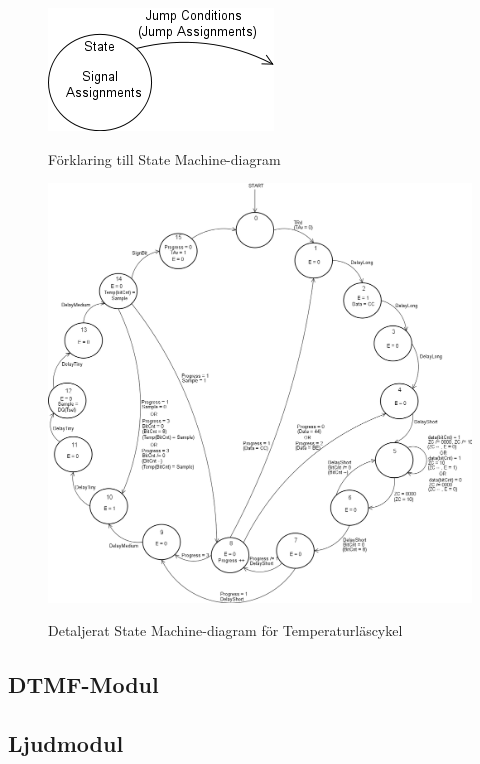 \documentclass[a4paper,11pt]{article}
\begin{document}
	\begin{figure}[ht!tb]
	  \centering
	      \includegraphics[scale=0.5, angle=0]{StateMachineExplained.png}
		\label{fig:SMExp}
	  	\caption{Förklaring till State Machine-diagram}
	\end{figure}

	\begin{figure}[ht!tb]
	  \centering
	      \includegraphics[scale=0.4, angle=0]{TempStateMachineDiagram.png}
		\label{fig:TempSM}
	  	\caption{Detaljerat State Machine-diagram för Temperaturläscykel}
	\end{figure}

		\subsection{DTMF-Modul}
		\subsection{Ljudmodul}
\end{document}
